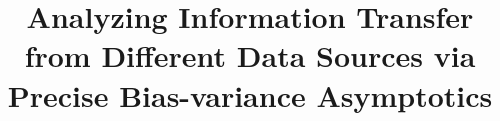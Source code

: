 \documentclass{article}
\newcommand*\samethanks[1][\value{footnote}]{\footnotemark[#1]}
\begin{document}
	\title{Analyzing Information Transfer from Different Data Sources via Precise Bias-variance Asymptotics}
	\iffalse
	\vspace{0.15in}
	\author[1]{Hongyang R. Zhang\thanks{HZ and FY contributed equally to the theoretical results. SW conducted the experimental analysis. Correspondence to hrzhang@northeastern.edu or fyang75@wharton.upenn.edu.}}
	\author[2]{Fan Yang\samethanks}
	\author[3]{Sen Wu\samethanks}
	\author[2]{Weijie J. Su}
	\author[3]{Christopher R\'e}
	\vspace{0.15in}
	\affil[1]{Khoury College of Computer Sciences, Northeastern University}
	\affil[2]{Department of Statistics, The Wharton School, University of Pennsylvania}
	\affil[3]{Department of Computer Science, Stanford University}
	\fi

	\maketitle
	
	
	
	
	
	
	
	
\end{document}
